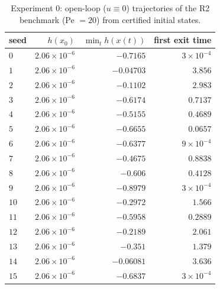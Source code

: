 \begin{table}[t]
\centering
\caption{Experiment 0: open-loop ($u\equiv0$) trajectories of the R2 benchmark (Pe $= 20$) from certified initial states.}
\label{tab:exp0_openloop}
\footnotesize
\setlength{\tabcolsep}{4pt}
\begin{tabular}{lrrr}
\toprule
seed & $h(x_0)$ & $\min_t h(x(t))$ & first exit time \\
\midrule
$0$ & $2.06\times10^{-6}$ & $-0.7165$ & $3\times10^{-4}$ \\
$1$ & $2.06\times10^{-6}$ & $-0.04703$ & $3.856$ \\
$2$ & $2.06\times10^{-6}$ & $-0.1102$ & $2.983$ \\
$3$ & $2.06\times10^{-6}$ & $-0.6174$ & $0.7137$ \\
$4$ & $2.06\times10^{-6}$ & $-0.5155$ & $0.4689$ \\
$5$ & $2.06\times10^{-6}$ & $-0.6655$ & $0.0657$ \\
$6$ & $2.06\times10^{-6}$ & $-0.6377$ & $9\times10^{-4}$ \\
$7$ & $2.06\times10^{-6}$ & $-0.4675$ & $0.8838$ \\
$8$ & $2.06\times10^{-6}$ & $-0.606$ & $0.4128$ \\
$9$ & $2.06\times10^{-6}$ & $-0.8979$ & $3\times10^{-4}$ \\
$10$ & $2.06\times10^{-6}$ & $-0.2972$ & $1.566$ \\
$11$ & $2.06\times10^{-6}$ & $-0.5958$ & $0.2889$ \\
$12$ & $2.06\times10^{-6}$ & $-0.2189$ & $2.061$ \\
$13$ & $2.06\times10^{-6}$ & $-0.351$ & $1.379$ \\
$14$ & $2.06\times10^{-6}$ & $-0.06081$ & $3.636$ \\
$15$ & $2.06\times10^{-6}$ & $-0.6837$ & $3\times10^{-4}$ \\
\bottomrule
\end{tabular}
\end{table}
